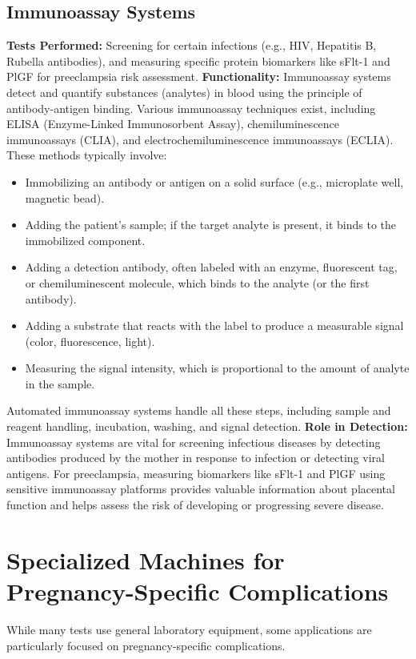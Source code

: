 \documentclass{article}
\begin{document}
\subsection{Immunoassay Systems}
\textbf{Tests Performed:} Screening for certain infections (e.g., HIV, Hepatitis B, Rubella antibodies), and measuring specific protein biomarkers like sFlt-1 and PlGF for preeclampsia risk assessment.
\textbf{Functionality:} Immunoassay systems detect and quantify substances (analytes) in blood using the principle of antibody-antigen binding. Various immunoassay techniques exist, including ELISA (Enzyme-Linked Immunosorbent Assay), chemiluminescence immunoassays (CLIA), and electrochemiluminescence immunoassays (ECLIA). These methods typically involve:
\begin{itemize}
    \item Immobilizing an antibody or antigen on a solid surface (e.g., microplate well, magnetic bead).
    \item Adding the patient's sample; if the target analyte is present, it binds to the immobilized component.
    \item Adding a detection antibody, often labeled with an enzyme, fluorescent tag, or chemiluminescent molecule, which binds to the analyte (or the first antibody).
    \item Adding a substrate that reacts with the label to produce a measurable signal (color, fluorescence, light).
    \item Measuring the signal intensity, which is proportional to the amount of analyte in the sample.
\end{itemize}
Automated immunoassay systems handle all these steps, including sample and reagent handling, incubation, washing, and signal detection.
\textbf{Role in Detection:} Immunoassay systems are vital for screening infectious diseases by detecting antibodies produced by the mother in response to infection or detecting viral antigens. For preeclampsia, measuring biomarkers like sFlt-1 and PlGF using sensitive immunoassay platforms provides valuable information about placental function and helps assess the risk of developing or progressing severe disease.

\section{Specialized Machines for Pregnancy-Specific Complications}

While many tests use general laboratory equipment, some applications are particularly focused on pregnancy-specific complications.
\end{document}
